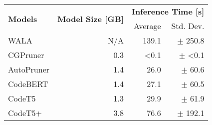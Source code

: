 \begin{tabular}{@{}lrrr@{}}
\toprule
 \multirow{2}{*}{\textbf{Models}} & \multirow{2}{*}{\textbf{Model Size [GB]}} & \multicolumn{2}{c}{\textbf{Inference Time [s]}} \\
\cmidrule{3-4}
 &  & Average & Std. Dev. \\ 
\midrule
WALA & N/A & 139.1 & $\pm$ 250.8 \\
\midrule
CGPruner\cite{utture2022striking} & 0.3  & <0.1 & $\pm$ <0.1\\
AutoPruner\cite{le2022autopruner} & 1.4 & 26.0 & $\pm$ 60.6\\
CodeBERT & 1.4 & 27.1 & $\pm$ 60.5\\
CodeT5 & 1.3 & 29.9& $\pm$ 61.9 \\
CodeT5+ & 3.8 & 76.6 & $\pm$ 192.1\\
\bottomrule
\end{tabular}